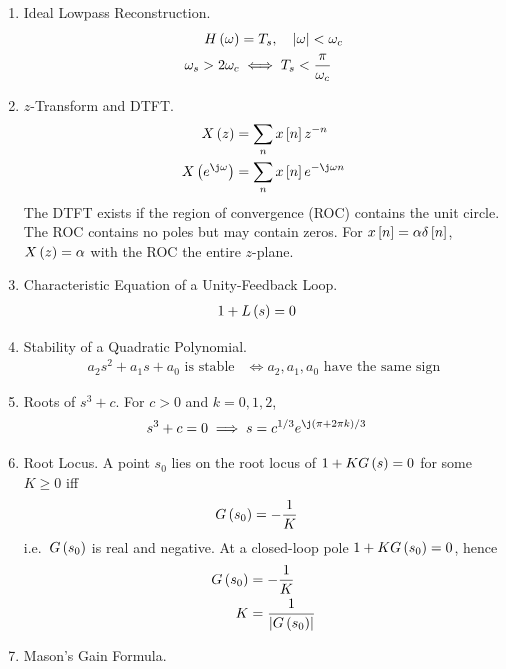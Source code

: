 \begin{enumerate}[label=\thesubsection.\arabic*, ref=\thesubsection.\theenumi]
\begin{align}
\\
Y\brak{\omega} &= \frac{1}{T_s} \sum_{k} e^{-\j k \omega_s \tau} F\brak{\omega - k \omega_s}
\end{align}
\item Ideal Lowpass Reconstruction.
\begin{align}
H\left(\omega\right) &= T_s, \quad \left\vert\omega\right\vert < \omega_c
\label{eq:F-lpf}
\\
\omega_s > 2\omega_c &\iff T_s < \frac{\pi}{\omega_c}
\label{eq:F-nyquist}
\end{align}
\item $z$-Transform and DTFT.
\begin{align}
X\brak{z} &= \sum_{n} x\sbrak{n} z^{-n}
\\
X\brak{e^{\j \omega}} &= \sum_{n} x\sbrak{n} e^{-\j \omega n}
\label{eq:F-ztrans}
\end{align}
The DTFT exists if the region of convergence (ROC) contains the unit circle. The ROC contains no poles but may contain zeros. For $x{}\left[n\right] = \alpha \delta{}\left[n\right]$, $X\left(z\right) = \alpha$ with the ROC the entire $z$-plane.
\item Characteristic Equation of a Unity-Feedback Loop.
\begin{align}
1 + L\left(s\right) &= 0
\label{eq:F-char}
\end{align}
\item Stability of a Quadratic Polynomial.
\begin{align}
a_2 s^2 + a_1 s + a_0 \text{ is stable} &\iff a_2, a_1, a_0 \text{ have the same sign}
\label{eq:F-hurwitz2}
\end{align}
\item Roots of $s^3 + c$. For $c > 0$ and $k = 0, 1, 2$,
\begin{align}
s^3 + c = 0 &\implies s = c^{1/3} e^{\j \brak{\pi + 2\pi k}/3}
\label{eq:F-cubic-roots}
\end{align}
\item Root Locus. A point $s_0$ lies on the root locus of $1 + K G\left(s\right) = 0$ for some $K \ge 0$ iff
\begin{align}
G\left(s_0\right) &= -\frac{1}{K}
\label{eq:F-rootlocus}
\end{align}
i.e.\ $G\left(s_0\right)$ is real and negative.
\solution At a closed-loop pole $1 + K G\left(s_0\right) = 0$, hence
\begin{align}
G\left(s_0\right) &= -\frac{1}{K}
\\
K &= \frac{1}{\left\vert G\left(s_0\right)\right\vert}
\end{align}
\item Mason's Gain Formula.

\end{enumerate}
